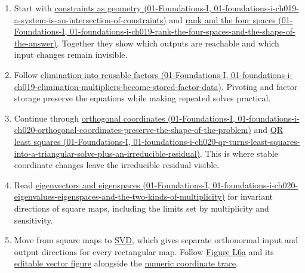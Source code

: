 \begin{enumerate}
\def\labelenumi{\arabic{enumi}.}
\tightlist
\item
  Start with \href{../01-Foundations-I/main.pdf\#nameddest=01-foundations-i-ch019-a-system-is-an-intersection-of-constraints}{constraints as geometry (01-Foundations-I, 01-foundations-i-ch019-a-system-is-an-intersection-of-constraints)} and \href{../01-Foundations-I/main.pdf\#nameddest=01-foundations-i-ch019-rank-the-four-spaces-and-the-shape-of-the-answer}{rank and the four spaces (01-Foundations-I, 01-foundations-i-ch019-rank-the-four-spaces-and-the-shape-of-the-answer)}. Together they show which outputs are reachable and which input changes remain invisible.
\item
  Follow \href{../01-Foundations-I/main.pdf\#nameddest=01-foundations-i-ch019-elimination-multipliers-become-stored-factor-data}{elimination into reusable factors (01-Foundations-I, 01-foundations-i-ch019-elimination-multipliers-become-stored-factor-data)}. Pivoting and factor storage preserve the equations while making repeated solves practical.
\item
  Continue through \href{../01-Foundations-I/main.pdf\#nameddest=01-foundations-i-ch020-orthogonal-coordinates-preserve-the-shape-of-the-problem}{orthogonal coordinates (01-Foundations-I, 01-foundations-i-ch020-orthogonal-coordinates-preserve-the-shape-of-the-problem)} and \href{../01-Foundations-I/main.pdf\#nameddest=01-foundations-i-ch020-qr-turns-least-squares-into-a-triangular-solve-plus-an-irreducible-residual}{QR least squares (01-Foundations-I, 01-foundations-i-ch020-qr-turns-least-squares-into-a-triangular-solve-plus-an-irreducible-residual)}. This is where stable coordinate changes leave the irreducible residual visible.
\item
  Read \href{../01-Foundations-I/main.pdf\#nameddest=01-foundations-i-ch020-eigenvalues-eigenspaces-and-the-two-kinds-of-multiplicity}{eigenvectors and eigenspaces (01-Foundations-I, 01-foundations-i-ch020-eigenvalues-eigenspaces-and-the-two-kinds-of-multiplicity)} for invariant directions of square maps, including the limits set by multiplicity and sensitivity.
\item
  Move from square maps to \hyperref[02-foundations-ii-ch024-the-svd-equation-as-independent-input-output-channels]{SVD}, which gives separate orthonormal input and output directions for every rectangular map. Follow \hyperref[02-foundations-ii-ch024-figure-l6a---watch-the-same-directions-become-an-ellipse]{Figure L6a} and its \href{Visual\%20Recall/phase8_svd_geometry.svg}{editable vector figure} alongside the \hyperref[02-foundations-ii-ch024-a-concrete-rotation-stretch-and-coordinate-trace]{numeric coordinate trace}.

\end{enumerate}

